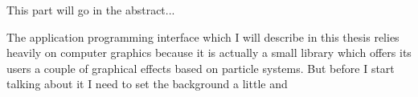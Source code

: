 This part will go in the abstract...

The application programming interface which I will describe in this thesis relies heavily on computer graphics because it is actually a small library which offers its users a couple of graphical effects based on particle systems. But before I start talking about it I need to set the background a little and